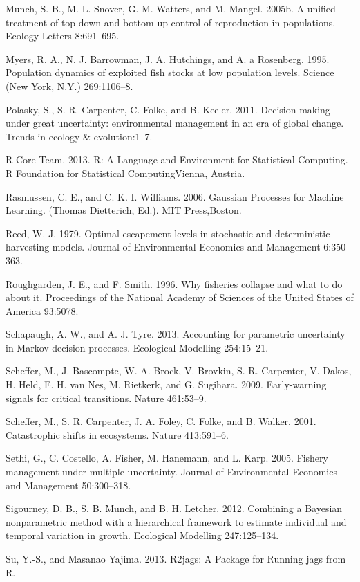 \documentclass[author-year, 12pt,review]{components/elsarticle} %
\begin{document}
Munch, S. B., M. L. Snover, G. M. Watters, and M. Mangel. 2005b. A
unified treatment of top-down and bottom-up control of reproduction in
populations. Ecology Letters 8:691--695.

Myers, R. A., N. J. Barrowman, J. A. Hutchings, and A. a Rosenberg.
1995. Population dynamics of exploited fish stocks at low population
levels. Science (New York, N.Y.) 269:1106--8.

Polasky, S., S. R. Carpenter, C. Folke, and B. Keeler. 2011.
Decision-making under great uncertainty: environmental management in an
era of global change. Trends in ecology \& evolution:1--7.

R Core Team. 2013. R: A Language and Environment for Statistical
Computing. R Foundation for Statistical ComputingVienna, Austria.

Rasmussen, C. E., and C. K. I. Williams. 2006. Gaussian Processes for
Machine Learning. (Thomas Dietterich, Ed.). MIT Press,Boston.

Reed, W. J. 1979. Optimal escapement levels in stochastic and
deterministic harvesting models. Journal of Environmental Economics and
Management 6:350--363.

Roughgarden, J. E., and F. Smith. 1996. Why fisheries collapse and what
to do about it. Proceedings of the National Academy of Sciences of the
United States of America 93:5078.

Schapaugh, A. W., and A. J. Tyre. 2013. Accounting for parametric
uncertainty in Markov decision processes. Ecological Modelling
254:15--21.

Scheffer, M., J. Bascompte, W. A. Brock, V. Brovkin, S. R. Carpenter, V.
Dakos, H. Held, E. H. van Nes, M. Rietkerk, and G. Sugihara. 2009.
Early-warning signals for critical transitions. Nature 461:53--9.

Scheffer, M., S. R. Carpenter, J. A. Foley, C. Folke, and B. Walker.
2001. Catastrophic shifts in ecosystems. Nature 413:591--6.

Sethi, G., C. Costello, A. Fisher, M. Hanemann, and L. Karp. 2005.
Fishery management under multiple uncertainty. Journal of Environmental
Economics and Management 50:300--318.

Sigourney, D. B., S. B. Munch, and B. H. Letcher. 2012. Combining a
Bayesian nonparametric method with a hierarchical framework to estimate
individual and temporal variation in growth. Ecological Modelling
247:125--134.

Su, Y.-S., and Masanao Yajima. 2013. R2jags: A Package for Running jags
from R.
\end{document}
